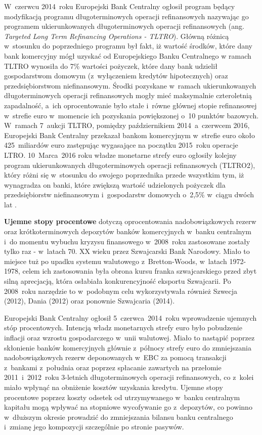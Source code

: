 W~czerwcu 2014~roku Europejski Bank Centralny ogłosił program będący modyfikacją programu długoterminowych operacji refinansowych nazywając go programem ukierunkowanych długoterminowych operacji refinansowych (ang. \textit{Targeted Long Term Refinancing Operations - TLTRO}). Główną różnicą w~stosunku do poprzedniego programu był fakt, iż wartość środków, które dany bank komercyjny mógł uzyskać od Europejskiego Banku Centralnego w ramach \acs{TLTRO} wynosiła do 7\% wartości pożyczek, które dany bank udzielił gospodarstwom domowym (z~wyłączeniem kredytów hipotecznych) oraz przedsiębiorstwom niefinansowym. Środki pozyskane w~ramach ukierunkowanych długoterminowych operacji refinansowych mogły mieć maksymalnie czteroletnią zapadalność, a~ich oprocentowanie było stałe i~równe głównej stopie refinansowej w~strefie euro w~momencie ich pozyskania powiększonej o~10 punktów bazowych. W~ramach 7~aukcji \acs{TLTRO}, pomiędzy październikiem 2014~a~czerwcem 2016, Europejski Bank Centralny przekazał bankom komercyjnym w~strefie euro około 425~miliardów euro zastępując wygasające na początku 2015~roku operacje \acs{LTRO}. 10~Marca~2016 roku władze monetarne strefy euro ogłosiły kolejny program ukierunkowanych długoterminowych operacji refinansowych (TLTRO2), który różni się w~stosunku do swojego poprzednika przede wszystkim tym, iż wynagradza on banki, które zwiększą wartość udzielonych pożyczek dla przedsiębiorstw niefinansowym i~gospodarstw domowych o~2,5\% w~ciągu dwóch lat \cite{tahiri33}.

\textbf{Ujemne stopy procentowe} dotyczą oprocentowania nadobowiązkowych rezerw oraz krótkoterminowych depozytów banków komercyjnych w~banku centralnym i~do momentu wybuchu kryzysu finansowego w~2008~roku zastosowane zostały tylko raz - w~latach 70. XX wieku przez Szwajcarski Bank Narodowy. Miało to miejsce tuż po upadku systemu walutowego z~Bretton-Woods, w~latach 1972-1978, celem ich zastosowania była obrona kursu franka szwajcarskiego przed zbyt silną aprecjacją, która osłabiała konkurencyjność eksportu Szwajcarii\cite{megg23}. Po 2008~roku narzędzie to w~podobnym celu wykorzystywała również Szwecja (2012), Dania (2012) oraz ponownie Szwajcaria (2014). 

Europejski Bank Centralny ogłosił 5~czerwca~2014~roku wprowadzenie ujemnych stóp procentowych. Intencją władz monetarnych strefy euro było pobudzenie inflacji oraz wzrostu gospodarczego w~unii walutowej. Miało to nastąpić poprzez skłonienie banków komercyjnych głównie z~północy strefy euro do zmniejszania nadobowiązkowych rezerw deponowanych w~\acs{EBC} za pomocą transakcji z~bankami z~południa oraz poprzez spłacanie zawartych na przełomie 2011~i~2012~roku 3-letnich długoterminowych operacji refinansowych, co z~kolei miało wpłynąć na obniżenie kosztów uzyskania kredytu. Ujemne stopy procentowe poprzez koszty odsetek od utrzymywanego w~banku centralnym kapitału mogą wpływać na stopniowe wycofywanie go z~depozytów, co powinno w~dłuższym okresie prowadzić do zmniejszania bilansu banku centralnego i~zmianę jego kompozycji szczególnie po stronie pasywów.

